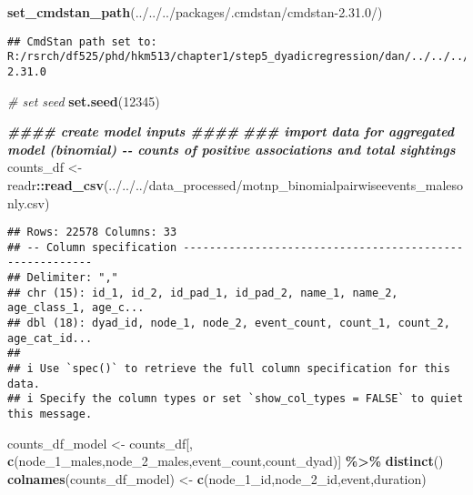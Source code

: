 \documentclass[
]{article}
\newenvironment{Shaded}{\begin{snugshade}}{\end{snugshade}}
\newcommand{\CommentTok}[1]{\textcolor[rgb]{0.56,0.35,0.01}{\textit{#1}}}
\newcommand{\DecValTok}[1]{\textcolor[rgb]{0.00,0.00,0.81}{#1}}
\newcommand{\DocumentationTok}[1]{\textcolor[rgb]{0.56,0.35,0.01}{\textbf{\textit{#1}}}}
\newcommand{\FunctionTok}[1]{\textcolor[rgb]{0.13,0.29,0.53}{\textbf{#1}}}
\newcommand{\NormalTok}[1]{#1}
\newcommand{\OtherTok}[1]{\textcolor[rgb]{0.56,0.35,0.01}{#1}}
\newcommand{\SpecialCharTok}[1]{\textcolor[rgb]{0.81,0.36,0.00}{\textbf{#1}}}
\newcommand{\StringTok}[1]{\textcolor[rgb]{0.31,0.60,0.02}{#1}}
\begin{document}
\begin{Shaded}
\begin{Highlighting}[]
\FunctionTok{set\_cmdstan\_path}\NormalTok{(}\StringTok{\textquotesingle{}../../../packages/.cmdstan/cmdstan{-}2.31.0/\textquotesingle{}}\NormalTok{)}
\end{Highlighting}
\end{Shaded}

\begin{verbatim}
## CmdStan path set to: R:/rsrch/df525/phd/hkm513/chapter1/step5_dyadicregression/dan/../../../packages/.cmdstan/cmdstan-2.31.0
\end{verbatim}

\begin{Shaded}
\begin{Highlighting}[]
\CommentTok{\# set seed}
\FunctionTok{set.seed}\NormalTok{(}\DecValTok{12345}\NormalTok{)}

\DocumentationTok{\#\#\#\# create model inputs \#\#\#\#}
\DocumentationTok{\#\#\# import data for aggregated model (binomial) {-}{-} counts of positive associations and total sightings}
\NormalTok{counts\_df }\OtherTok{\textless{}{-}}\NormalTok{ readr}\SpecialCharTok{::}\FunctionTok{read\_csv}\NormalTok{(}\StringTok{\textquotesingle{}../../../data\_processed/motnp\_binomialpairwiseevents\_malesonly.csv\textquotesingle{}}\NormalTok{)}
\end{Highlighting}
\end{Shaded}

\begin{verbatim}
## Rows: 22578 Columns: 33
## -- Column specification --------------------------------------------------------
## Delimiter: ","
## chr (15): id_1, id_2, id_pad_1, id_pad_2, name_1, name_2, age_class_1, age_c...
## dbl (18): dyad_id, node_1, node_2, event_count, count_1, count_2, age_cat_id...
## 
## i Use `spec()` to retrieve the full column specification for this data.
## i Specify the column types or set `show_col_types = FALSE` to quiet this message.
\end{verbatim}

\begin{Shaded}
\begin{Highlighting}[]
\NormalTok{counts\_df\_model }\OtherTok{\textless{}{-}}\NormalTok{ counts\_df[, }\FunctionTok{c}\NormalTok{(}\StringTok{\textquotesingle{}node\_1\_males\textquotesingle{}}\NormalTok{,}\StringTok{\textquotesingle{}node\_2\_males\textquotesingle{}}\NormalTok{,}\StringTok{\textquotesingle{}event\_count\textquotesingle{}}\NormalTok{,}\StringTok{\textquotesingle{}count\_dyad\textquotesingle{}}\NormalTok{)] }\SpecialCharTok{\%\textgreater{}\%} \FunctionTok{distinct}\NormalTok{()}
\FunctionTok{colnames}\NormalTok{(counts\_df\_model) }\OtherTok{\textless{}{-}} \FunctionTok{c}\NormalTok{(}\StringTok{\textquotesingle{}node\_1\_id\textquotesingle{}}\NormalTok{,}\StringTok{\textquotesingle{}node\_2\_id\textquotesingle{}}\NormalTok{,}\StringTok{\textquotesingle{}event\textquotesingle{}}\NormalTok{,}\StringTok{\textquotesingle{}duration\textquotesingle{}}\NormalTok{)}
\end{Highlighting}
\end{Shaded}
\end{document}
